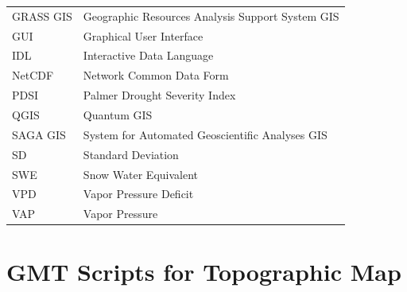 \documentclass[geosciences,article,accept,pdftex,oneauthor]{Definitions/mdpi}
\begin{document}
{\noindent 
\begin{tabular}{@{}ll}
GRASS GIS & Geographic Resources Analysis Support System GIS \\
GUI & Graphical User Interface \\
IDL & Interactive Data Language \\
NetCDF & Network Common Data Form \\
PDSI & Palmer Drought Severity Index \\
QGIS & Quantum GIS \\
SAGA GIS & System for Automated Geoscientific Analyses GIS \\
SD & Standard Deviation \\
SWE & Snow Water Equivalent \\
VPD & Vapor Pressure Deficit \\
VAP & Vapor Pressure \\
\end{tabular}

}


{} %
\appendixstart
\appendix
\section[\appendixname~\thesection]{GMT Scripts for Topographic Map}
\end{document}
